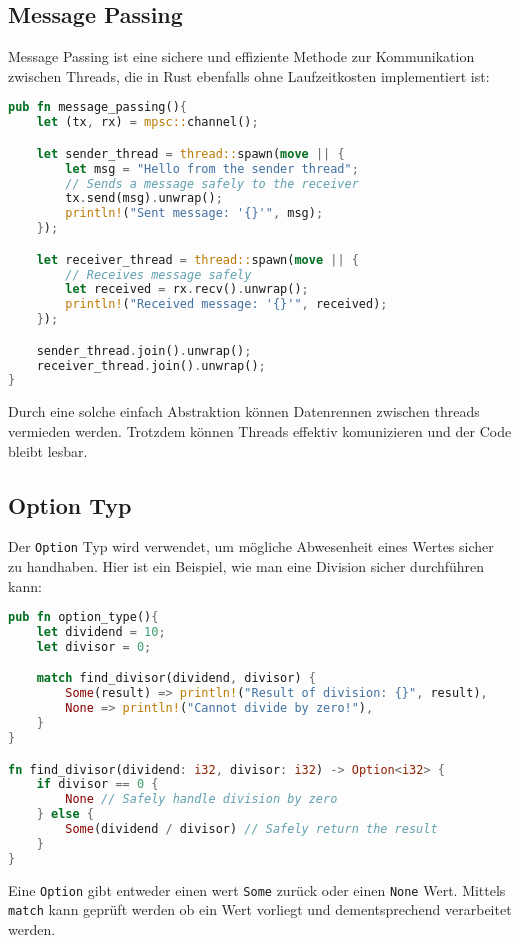 \subsection{Message Passing}

Message Passing ist eine sichere und effiziente Methode zur Kommunikation zwischen Threads, die in Rust ebenfalls ohne Laufzeitkosten implementiert ist:

\begin{lstlisting}[language=Rust, caption=Message Passing ]
pub fn message_passing(){
    let (tx, rx) = mpsc::channel();

    let sender_thread = thread::spawn(move || {
        let msg = "Hello from the sender thread";
        // Sends a message safely to the receiver
        tx.send(msg).unwrap(); 
        println!("Sent message: '{}'", msg);
    });

    let receiver_thread = thread::spawn(move || {
        // Receives message safely
        let received = rx.recv().unwrap(); 
        println!("Received message: '{}'", received);
    });

    sender_thread.join().unwrap();
    receiver_thread.join().unwrap();
}
\end{lstlisting}
Durch eine solche einfach Abstraktion können Datenrennen zwischen threads vermieden werden.
Trotzdem können Threads effektiv komunizieren und der Code bleibt lesbar.
\subsection{Option Typ}

Der \texttt{Option} Typ wird verwendet, um mögliche Abwesenheit eines Wertes sicher zu handhaben. Hier ist ein Beispiel, wie man eine Division sicher durchführen kann:

\begin{lstlisting}[language=Rust, caption=Option Typ]
pub fn option_type(){
    let dividend = 10;
    let divisor = 0;

    match find_divisor(dividend, divisor) {
        Some(result) => println!("Result of division: {}", result),
        None => println!("Cannot divide by zero!"),
    }
}

fn find_divisor(dividend: i32, divisor: i32) -> Option<i32> {
    if divisor == 0 {
        None // Safely handle division by zero
    } else {
        Some(dividend / divisor) // Safely return the result
    }
}
\end{lstlisting}
\noindent
Eine \texttt{Option} gibt entweder einen wert \texttt{Some} zurück oder einen \texttt{None} Wert.
Mittels \texttt{match} kann geprüft werden ob ein Wert vorliegt und dementsprechend verarbeitet werden.

